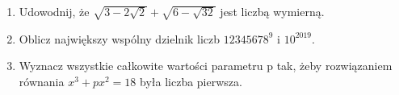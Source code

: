 \documentclass[10pt]{article}
\begin{document}
\begin{enumerate}
  \item Udowodnij, że \(\sqrt{3-2 \sqrt{2}}+\sqrt{6-\sqrt{32}}\) jest liczbą wymierną.
  \item Oblicz największy wspólny dzielnik liczb \(12345678^{9}\) i \(10^{2019}\).
  \item Wyznacz wszystkie całkowite wartości parametru p tak, żeby rozwiązaniem równania \(x^{3}+p x^{2}=18\) była liczba pierwsza.
\end{enumerate}
\end{document}

